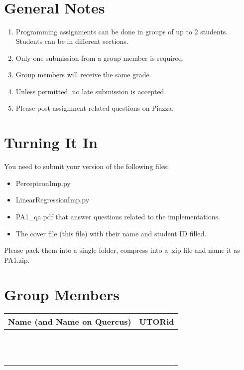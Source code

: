\documentclass{article}
\title{\vspace{-2.5cm}\textbf{\coursefullname}\\\hatypeandnun\\\haname}
\date{}
\theoremstyle{definition}
\begin{document}
\maketitle
\vspace*{-2cm}
\section*{General Notes}
\begin{enumerate}
	\item Programming assignments can be done in groups of up to 2 students. Students can be in different sections.
	\item Only one submission from a group member is required.
	\item Group members will receive the same grade.
	\item Unless permitted, no late submission is accepted.
	\item Please post assignment-related questions on Piazza.
\end{enumerate}

\section*{Turning It In}
You need to submit your version of the following files:
\begin{itemize}
	\item PerceptronImp.py
	\item LinearRegressionImp.py
	\item PA1\_qa.pdf that answer questions related to the implementations.
	\item The cover file (this file) with their name and student ID filled.
\end{itemize}
Please pack them into a single folder, compress into a .zip file and name it as PA1.zip.

\section*{Group Members}
\begin{center}
		\begin{tabular}{|p{4.5in}|p{2in}|}
			\hline
			Name (and Name on Quercus) & UTORid\\\hline
			& \\
			& \\
			& \\
			& \\
			& \\
			& \\\hline
			& \\
			& \\
			& \\
			& \\
			& \\
			& \\
			\hline
		\end{tabular}
\end{center}
\end{document}
